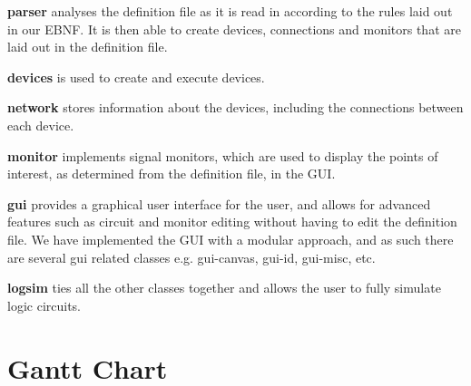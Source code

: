 \documentclass[a4paper,10pt]{article}
\begin{document}
\textbf{parser} analyses the definition file as it is read in according to the rules laid out in our EBNF. It is then able to create devices, connections and monitors that are laid out in the definition file.

\textbf{devices} is used to create and execute devices. 

\textbf{network} stores information about the devices, including the connections between each device.

\textbf{monitor} implements signal monitors, which are used to display the points of interest, as determined from the definition file, in the GUI.

\textbf{gui} provides a graphical user interface for the user, and allows for advanced features such as circuit and monitor editing without having to edit the definition file. We have implemented the GUI with a modular approach, and as such there are several gui related classes e.g. gui-canvas, gui-id, gui-misc, etc.

\textbf{logsim} ties all the other classes together and allows the user to fully simulate logic circuits.

\pagebreak

\section{Gantt Chart}
\label{sec:gantt}
\end{document}
